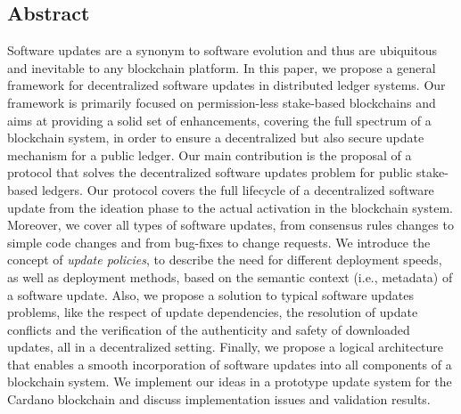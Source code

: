 \subsection*{Abstract}
Software updates are a synonym to software evolution and thus are ubiquitous and inevitable to any blockchain platform. In this paper, we propose a general framework for decentralized software updates in distributed ledger systems. Our framework is primarily focused on permission-less stake-based blockchains and aims at providing a solid set of enhancements, covering the full spectrum of a blockchain system, in order to ensure a decentralized but also secure update mechanism for a public ledger. 
Our main contribution is the proposal of a protocol that solves the decentralized software updates problem for public stake-based ledgers. Our protocol covers the full lifecycle of a decentralized software update from the ideation phase to the actual activation in the blockchain system. Moreover, we cover all types of software updates, from consensus rules changes to simple code changes and from bug-fixes to change requests. We introduce the concept of \emph{update policies}, to describe the need for different deployment speeds, as well as deployment methods, based on the semantic context (i.e., metadata) of a software update. Also, we propose a solution to typical software updates problems, like the respect of update dependencies, the resolution of update conflicts and the verification of the authenticity and safety of downloaded updates, all in a decentralized setting. Finally, we propose a logical architecture that enables a smooth incorporation of software updates into all components of a blockchain system. We implement our ideas in a prototype update system for the Cardano blockchain and discuss implementation issues and validation results.



